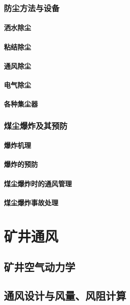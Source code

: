 \documentclass[UTF8]{../../ApplicationUniverse}
\begin{document}
        \subsubsection{防尘方法与设备}
            \paragraph{洒水除尘}
            \paragraph{粘结除尘}
            \paragraph{通风除尘}
            \paragraph{电气除尘}
            \paragraph{各种集尘器}
        \subsubsection{煤尘爆炸及其预防}
            \paragraph{爆炸机理}
            \paragraph{爆炸的预防}
            \paragraph{煤尘爆炸时的通风管理}
            \paragraph{煤尘爆炸事故处理}
\section{矿井通风}
    \subsection{矿井空气动力学}
    \subsection{通风设计与风量、风阻计算}
\end{document}
